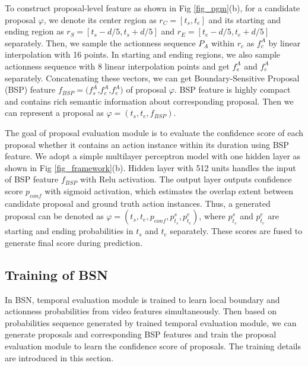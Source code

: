 \documentclass[runningheads]{llncs}
\begin{document}
To construct proposal-level feature as shown in Fig \ref{fig_pgm}(b), for a candidate proposal $\varphi$, we denote its  center region as $r_C=[t_s,t_e]$ and its starting and ending region as $r_S=[ t_s-d/5,t_s+d/5 ]$ and $r_E= [ t_e-d/5,t_e+d/5 ]$ separately. %
% 
Then, we sample the actionness sequence $P_A$ within $r_c$ as $f_{c}^A$  by linear interpolation with 16 points. In starting and ending regions, we also sample actionness  sequence with 8 linear  interpolation points and get $f_{s}^A$ and $f_{e}^A$ separately. Concatenating these vectors, we can get Boundary-Sensitive Proposal (BSP) feature $f_{BSP}=(f_s^A$,$f_c^A$,$f_e^A)$ of proposal $\varphi$. 
BSP feature is highly compact and contains rich semantic information about corresponding proposal. 
Then we can represent a proposal as $\varphi=(t_s,t_e,f_{BSP})$.%

The goal of proposal evaluation module is to evaluate the confidence score of each proposal whether it contains an action instance within its duration using BSP feature. We adopt a simple multilayer perceptron model with one hidden layer as shown in Fig \ref{fig_framework}(b). Hidden layer with 512 units  handles the input of BSP feature $f_{BSP}$ with Relu  activation. The output layer outputs confidence score $p_{conf}$ with sigmoid activation, which estimates the overlap extent between candidate proposal and ground truth action instances. Thus, a generated proposal can be denoted  as $\varphi=(t_s,t_e,p_{conf},p^s_{t_s},p^e_{t_e})$, where $p^s_{t_s}$ and $p^e_{t_e}$ are starting and ending probabilities in $t_s$ and $t_e$ separately. These scores are fused to generate final score during prediction.



\subsection{Training of BSN }

In BSN, temporal evaluation module is trained to learn local boundary and actionness probabilities  from video features simultaneously. Then based on probabilities sequence generated by trained temporal evaluation module, we can generate proposals and corresponding BSP features and train the proposal evaluation module to learn the confidence score of proposals. The training details are introduced in this section.
\end{document}
